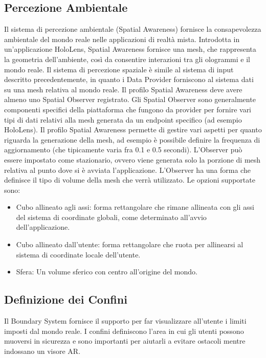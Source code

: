 \subsection{Percezione Ambientale}
Il sistema di percezione ambientale (Spatial Awareness) fornisce la consapevolezza ambientale del mondo reale nelle applicazioni di realtà mista. Introdotta in un'applicazione HoloLens, Spatial Awareness fornisce una mesh, che rappresenta la geometria dell'ambiente, così da consentire interazioni tra gli ologrammi e il mondo reale.
Il sistema di percezione spaziale è simile al sistema di input descritto precedentemente, in quanto i Data Provider forniscono al sistema dati su una mesh relativa al mondo reale. Il profilo Spatial Awareness deve avere almeno uno Spatial Observer registrato. Gli Spatial Observer sono generalmente componenti specifici della piattaforma che fungono da provider per fornire vari tipi di dati relativi alla mesh generata da un endpoint specifico (ad esempio HoloLens).
Il profilo Spatial Awareness permette di gestire vari aspetti per quanto riguarda la generazione della mesh, ad esempio è possibile definire la frequenza di aggiornamento (che tipicamente varia fra 0.1 e 0.5 secondi).
L'Observer può essere impostato come stazionario, ovvero viene generata solo la porzione di mesh relativa al punto dove si è avviata l'applicazione.
L'Observer ha una forma che definisce il tipo di volume della mesh che verrà utilizzato. Le opzioni supportate sono:

\begin{itemize}
    \item Cubo allineato agli assi: forma rettangolare che rimane allineata con gli assi del sistema di coordinate globali, come determinato all'avvio dell'applicazione.
    \item Cubo allineato dall'utente: forma rettangolare che ruota per allinearsi al sistema di coordinate locale dell'utente.
    \item Sfera: Un volume sferico con centro all'origine del mondo.
\end{itemize}

\subsection{Definizione dei Confini}
Il Boundary System fornisce il supporto per far visualizzare all'utente i limiti imposti dal mondo reale.
I confini definiscono l'area in cui gli utenti possono muoversi in sicurezza e sono importanti per aiutarli a evitare ostacoli mentre indossano un visore AR.

